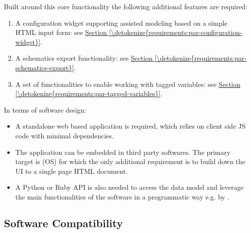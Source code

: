 \documentclass[letterpaper,10pt, openany,english]{sphinxmanual}
\begin{document}
Built around this core functionality the following additional features are required:
\begin{enumerate}
%
\item {} 
A configuration widget supporting assisted modeling based on a simple HTML input form: see \hyperref[\detokenize{requirements:par-configuration-widget}]{Section \ref{\detokenize{requirements:par-configuration-widget}}}.

\item {} 
A schematics export functionality: see \hyperref[\detokenize{requirements:par-schematics-export}]{Section \ref{\detokenize{requirements:par-schematics-export}}}.

\item {} 
A set of functionalities to enable working with tagged variables: see \hyperref[\detokenize{requirements:par-tagged-variables}]{Section \ref{\detokenize{requirements:par-tagged-variables}}}.

\end{enumerate}

In terms of software design:
\begin{itemize}
\item {} 
A standalone web based application is required, which relies on client side JS code with minimal dependencies.

\item {} 
The application can be embedded in third party softwares. The primary target is  (OS) for which the only additional requirement is to build down the UI to a single page HTML document.

\item {} 
A Python or Ruby API is also needed to access the data model and leverage the main functionalities of the software in a programmatic way e.g. by .

\end{itemize}


\subsection{Software Compatibility}
\label{\detokenize{requirements:software-compatibility}}
\end{document}
